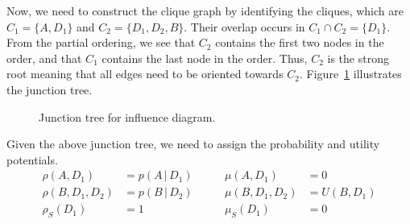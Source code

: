 \documentclass{article}
\newcommand{\giv}{\,|\,}
\begin{document}
\noindent Now, we need to construct the clique graph by identifying the cliques, which are $C_1 = \{A, D_1\}$ and $C_2 = \{D_1, D_2, B\}$. Their overlap occurs in $C_1 \cap C_2 = \{D_1\}$. From the partial ordering, we see that $C_2$ contains the first two nodes in the order, and that $C_1$ contains the last node in the order. Thus, $C_2$ is the strong root meaning that all edges need to be oriented towards $C_2$. Figure~\ref{fig:ID_EX4} illustrates the junction tree. 

\begin{figure}[H]
    \centering
    \caption{Junction tree for influence diagram. }
    \label{fig:ID_EX4}
\end{figure} 

\noindent Given the above junction tree, we need to assign the probability and utility potentials. 
\begin{align*}
    \rho(A, D_1) &= p(A \giv D_1) \qquad& \mu(A, D_1) &= 0\\
    \rho(B, D_1, D_2) &= p(B \giv D_2) \qquad& \mu(B, D_1, D_2) &= U(B, D_1)\\
    \rho_S(D_1) &= 1 \qquad& \mu_S(D_1) &= 0    
\end{align*}
\end{document}
